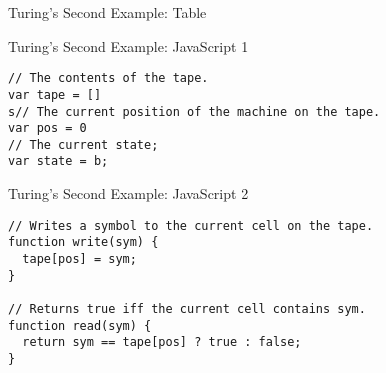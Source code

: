 \begin{frame}{Turing's Second Example: Table}
  \begin{table}
  \end{table}
\end{frame}


\begin{frame}[fragile]{Turing's Second Example: JavaScript 1}
\begin{verbatim}
// The contents of the tape.
var tape = []
s// The current position of the machine on the tape.
var pos = 0
// The current state;
var state = b;
\end{verbatim}
\end{frame}

\begin{frame}[fragile]{Turing's Second Example: JavaScript 2}
\begin{verbatim}
// Writes a symbol to the current cell on the tape.
function write(sym) {
  tape[pos] = sym;
}

// Returns true iff the current cell contains sym.
function read(sym) {
  return sym == tape[pos] ? true : false;
}
\end{verbatim}
\end{frame}

